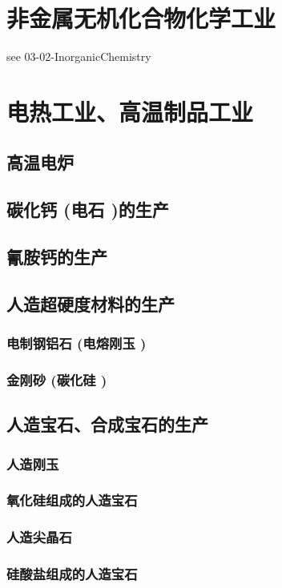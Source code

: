 \documentclass[UTF8]{../../ApplicationUniverse}
\begin{document}
\chapter{非金属无机化合物化学工业} %
see 
03-02-InorganicChemistry



\chapter{电热工业、高温制品工业}
\section{高温电炉}
\section{碳化钙 (电石 )的生产}
\section{氰胺钙的生产}
\section{人造超硬度材料的生产}
    \subsection{电制钢铝石 (电熔刚玉 )}
    \subsection{金刚砂 (碳化硅 )}
\section{人造宝石、合成宝石的生产}
    \subsection{人造刚玉}
    \subsection{氧化硅组成的人造宝石}
    \subsection{人造尖晶石}
    \subsection{硅酸盐组成的人造宝石}
\end{document}
